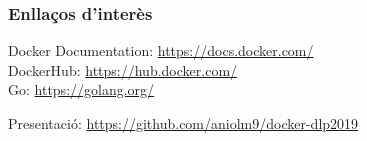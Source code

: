 \begin{frame}
  \frametitle{Enllaços d'interès}
  Docker Documentation: \href{https://docs.docker.com/}{https://docs.docker.com/} \\
  
  DockerHub: \href{https://hub.docker.com/}{https://hub.docker.com/} \\
  
  Go: \href{https://golang.org/}{https://golang.org/}\\
  
  \hrulefill
  
  Presentació: \href{https://github.com/aniolm9/docker-dlp2019}{https://github.com/aniolm9/docker-dlp2019}
\end{frame}